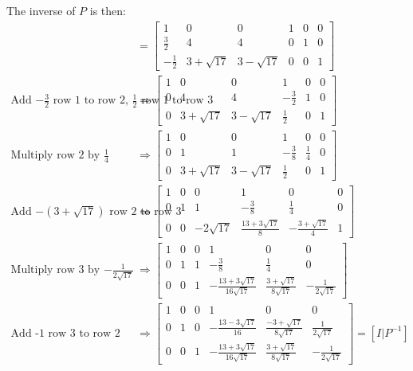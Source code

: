 \documentclass[11pt]{homework}
\begin{document}
The inverse of $P$ is then:
\begin{align*}
[P|I]& = 
  \left[
  \begin{array}{ccc|ccc}
    1            & 0             & 0             & 1 & 0 & 0 \\
    \frac{3}{2}  & 4             & 4             & 0 & 1 & 0 \\
    -\frac{1}{2} & 3 + \sqrt{17} & 3 - \sqrt{17} & 0 & 0 & 1 
  \end{array}
  \right] \\
\text{Add $-\frac{3}{2}$ row 1 to row 2, $\frac{1}{2}$ row 1 to row 3}
  & \Rightarrow
  \left[
  \begin{array}{ccc|ccc}
    1 & 0             & 0             & 1 & 0 & 0 \\
    0 & 4             & 4             & -\frac{3}{2} & 1 & 0 \\
    0 & 3 + \sqrt{17} & 3 - \sqrt{17} & \frac{1}{2} & 0 & 1 
  \end{array}
  \right] \\
\text{Multiply row 2 by $\frac{1}{4}$}
  & \Rightarrow
  \left[
  \begin{array}{ccc|ccc}
    1 & 0             & 0             & 1 & 0 & 0 \\
    0 & 1             & 1             & -\frac{3}{8} & \frac{1}{4} & 0 \\
    0 & 3 + \sqrt{17} & 3 - \sqrt{17} & \frac{1}{2} & 0 & 1 
  \end{array}
  \right] \\
\text{Add $-(3+\sqrt{17})$ row 2 to row 3}
  & \Rightarrow
  \left[
  \begin{array}{ccc|ccc}
    1 & 0 & 0             & 1                       & 0 & 0 \\
    0 & 1 & 1             & -\frac{3}{8}            & \frac{1}{4} & 0 \\
    0 & 0 & -2\sqrt{17} & \frac{13+3\sqrt{17}}{8} & -\frac{3+\sqrt{17}}{4} & 1 
  \end{array}
  \right] \\
\text{Multiply row 3 by $-\frac{1}{2\sqrt{17}}$ }
  & \Rightarrow
  \left[
  \begin{array}{ccc|ccc}
    1 & 0 & 0 & 1                       & 0 & 0 \\
    0 & 1 & 1 & -\frac{3}{8}            & \frac{1}{4} & 0 \\
    0 & 0 & 1 & -\frac{13+3\sqrt{17}}{16\sqrt{17}} & \frac{3+\sqrt{17}}{8\sqrt{17}} & -\frac{1}{2\sqrt{17}}
  \end{array}
  \right] \\
\text{Add -1 row 3 to row 2}
  & \Rightarrow
  \left[
  \begin{array}{ccc|ccc}
    1 & 0 & 0 & 1                         & 0 & 0 \\
    0 & 1 & 0 & -\frac{13-3\sqrt{17}}{16} & \frac{-3 + \sqrt{17}}{8\sqrt{17}} & \frac{1}{2\sqrt{17}} \\
    0 & 0 & 1 & -\frac{13+3\sqrt{17}}{16\sqrt{17}} & \frac{3+\sqrt{17}}{8\sqrt{17}} & -\frac{1}{2\sqrt{17}}
  \end{array}
  \right] = [I|P^{-1}]
\end{align*}
\end{document}

